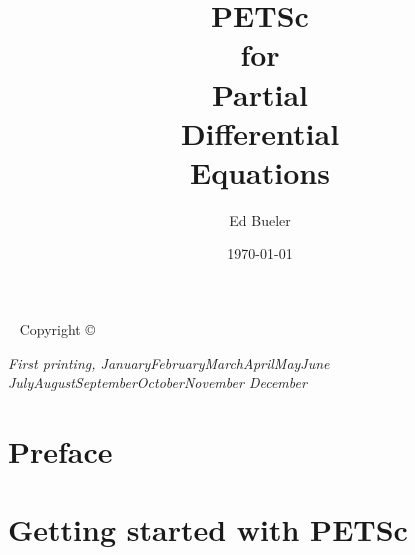 \documentclass{tufte-book}
\title[PETSc for PDEs]{PETSc \\ for \\ Partial \\ Differential \\ Equations}
\author{Ed Bueler}
\date{\today}
\newcommand{\CODELOC}{}  %
\theoremstyle{definition}
\newcommand{\openepigraph}[2]{%
  \begin{fullwidth}
  \sffamily\large
  \begin{doublespace}
  \noindent\allcaps{#1}\\%
  \noindent \Large \allcaps{#2}%
  \end{doublespace}
  \end{fullwidth}
}
\newcommand{\monthyear}{%
  \ifcase\month\or January\or February\or March\or April\or May\or June\or
  July\or August\or September\or October\or November\or
  December\fi\space\number\year
}
\begin{document}
\begin{comment}
\newpage\thispagestyle{empty}
\openepigraph{%
\dots when there are disputes among persons, we can simply say: Let us calculate, without further ado, to see who is right.
}{Gottfried Wilhelm Leibniz}
\vfill
\openepigraph{%
Developing parallel, nontrivial PDE solvers that deliver high performance is still difficult and requires months (or even years) of concentrated effort.  PETSc is a toolkit that can ease these difficulties and reduce the development time, but it is not a black-box PDE solver, nor a silver bullet
}{Barry Smith}
\vfill
\openepigraph{%
Tufte's style is known for its extensive use of sidenotes, tight integration of graphics with text, and well-set typography.
}{The Tufte-LaTeX\ Developers}
\vfill

\frontmatter
\end{comment}

\maketitle


\newpage
\begin{fullwidth}
~\vfill
\thispagestyle{empty}
\setlength{\parindent}{0pt}
\setlength{\parskip}{\baselineskip}
Copyright \copyright\ \the\year\ \thanklessauthor

\par{}


\par\textit{First printing, \monthyear}
\end{fullwidth}

\tableofcontents




\chapter*{Preface}


\mainmatter


\chapter{Getting started with PETSc}
\label{chap:getstarted}
\renewcommand{\CODELOC}{c/ch1/}

\end{document}
